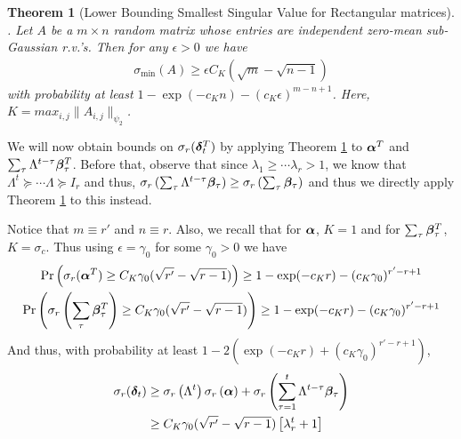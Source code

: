 \documentclass[10pt]{article}
\newtheorem{theorem}{Theorem}
\begin{document}
\begin{theorem}[Lower Bounding Smallest Singular Value for Rectangular matrices]\label{thm:lower_bnd_rect}.
Let $A$ be a $m \times n$ random matrix whose entries are independent zero-mean sub-Gaussian r.v.'s. Then for any $\epsilon >0$ we have 
\begin{align*}
\sigma_{\min}(A) \geq \epsilon C_K(\sqrt{m} - \sqrt{n-1}) 
\end{align*}
with probability at least $1 -  \exp(-c_K n) - (c_K \epsilon)^{m -n +1}$. Here, $K = max_{i,j} \|A_{i,j}\|_{\psi_2}$. 
\end{theorem} 
We will now obtain bounds on $\sigma_r(\bm{\delta}_t^T)$ by applying Theorem \ref{thm:lower_bnd_rect} to $\bm{\alpha}^T$ and $\sum_\tau \Lambda^{t-\tau} \bm{\beta}_\tau^T$. Before that, observe that since $\lambda_1 \geq \cdots \lambda_r >1$, we know that $\Lambda^t \succeq \cdots \Lambda \succeq I_r$ and thus, $\sigma_r\left( \sum_{\tau} \Lambda^{t-\tau} \bm{\beta}_\tau \right) \geq \sigma_r\left( \sum_{\tau} \bm{\beta}_\tau \right)$ and thus we directly apply Theorem \ref{thm:lower_bnd_rect} to this instead. 


Notice that $m \equiv r'$ and $n \equiv r$. Also, we recall that for $\bm{\alpha}$, $K = 1$ and for $\sum_\tau  \bm{\beta}_\tau^T$, $K = \sigma_c $. Thus using $\epsilon = \gamma_0$ for some $\gamma_0 > 0$ we have
\begin{gather*}
\Pr\left(\sigma_{r}(\bm{\alpha}^T) \geq C_K \gamma_0(\sqrt{r'} - \sqrt{r-1})\right) \geq  1 - \exp(-c_Kr) - (c_K \gamma_0)^{r'-r+1} \\
\Pr\left(\sigma_{r}\left(\sum_\tau \bm{\beta}_\tau^T \right) \geq C_K \gamma_0(\sqrt{r'} - \sqrt{r-1})\right) \geq  1 - \exp(-c_Kr) - (c_K \gamma_0)^{r'-r+1}
\end{gather*}
And thus, with probability at least $1 - 2 (\exp(-c_Kr) + (c_K\gamma_0)^{r' - r + 1})$, 
\begin{align*}
\sigma_r(\bm{\delta}_t) &\geq \sigma_r\left(\Lambda^t \right) \sigma_r \left( \bm{\alpha}\right) + \sigma_r\left( \sum_{\tau=1}^t \Lambda^{t-\tau} \bm{\beta}_\tau\right) \\
&\geq C_K \gamma_0(\sqrt{r'} - \sqrt{r-1}) \left[ \lambda_r^t + 1\right]
\end{align*}
\end{document}
